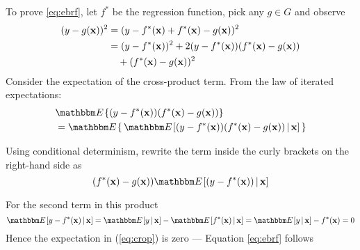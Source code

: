 \begin{frame}

    \vspace{2em}
    To prove \eqref{eq:ebrf}, let $f^*$ be the regression function, pick any $g \in G$ and observe 
    \begin{align*}
        (y - g({\mathbf x}))^2 
        & = (y - f^*({\mathbf x}) + f^*({\mathbf x}) - g({\mathbf x}))^2  \\
        & = (y - f^*({\mathbf x}) )^2 + 2(y - f^*({\mathbf x}))(f^*({\mathbf x}) - g({\mathbf x}))\\&\quad +
        (f^*({\mathbf x}) - g({\mathbf x}))^2  
    \end{align*}
    Consider the expectation of the cross-product term. From the law of iterated expectations:
    \begin{align}
        \label{eq:crop}
        &\EE \{ (y - f^*(\boldx)) (f^*(\boldx) - g(\boldx)) \}
        \\ \nonumber & = \EE \{ \, \EE[ (y - f^*(\boldx)) (f^*(\boldx) - g(\boldx)) \given \boldx ]\,  \} 
    \end{align}

\end{frame}
    
\begin{frame}
    
    \vspace{2em}
    Using conditional determinism, rewrite the term inside the curly
    brackets on the right-hand side as $$(f^*(\boldx) -
    g(\boldx)) \EE[ (y - f^*(\boldx))  \given \boldx ]$$

    For the second term in
    this product
    \begin{equation*}
         \EE[ y - f^*(\boldx) \given \boldx] 
         = \EE[ y \given \boldx] - \EE[ f^*(\boldx) \given \boldx] 
         = \EE[ y \given \boldx] -  f^*(\boldx)
         = 0
    \end{equation*}
    Hence the expectation in (\ref{eq:crop}) is zero --- Equation \eqref{eq:ebrf} follows
        
\end{frame}

